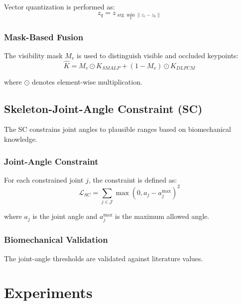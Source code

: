 \documentclass[runningheads]{llncs}
\begin{document}
Vector quantization is performed as:
\begin{equation}
z_q = z_{\arg\min_k \|z_e - z_k\|}
\label{eq:vq}
\end{equation}

\subsubsection{Mask-Based Fusion}

The visibility mask $M_v$ is used to distinguish visible and occluded keypoints:
\begin{equation}
\hat{K} = M_v \odot K_{SMALP} + (1 - M_v) \odot K_{DLPCM}
\label{eq:fusion}
\end{equation}

where $\odot$ denotes element-wise multiplication.

\subsection{Skeleton-Joint-Angle Constraint (SC)}
\label{subsec:sc}

The SC constrains joint angles to plausible ranges based on biomechanical knowledge.

\subsubsection{Joint-Angle Constraint}

For each constrained joint $j$, the constraint is defined as:
\begin{equation}
\mathcal{L}_{SC} = \sum_{j \in \mathcal{J}} \max(0, a_j - a_j^{\max})^2
\label{eq:sc_loss}
\end{equation}

where $a_j$ is the joint angle and $a_j^{\max}$ is the maximum allowed angle.

\subsubsection{Biomechanical Validation}

The joint-angle thresholds are validated against literature values.

%
\section{Experiments}
\label{sec:experiments}
\end{document}
